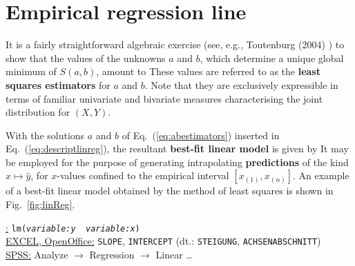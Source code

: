 \section[Empirical regression line]{Empirical regression line}
It is a fairly straightforward algebraic exercise (see, e.g., 
Toutenburg (2004) ) to show that the 
values of the unknowns $a$ and $b$, which determine a unique 
global minimum of $S(a,b)$, amount to
%
\be
{}
\ee
%
These values are referred to as the \textbf{least squares
estimators} for $a$ and $b$. Note that they are exclusively
expressible in terms of familiar univariate and bivariate measures characterising the joint distribution for $(X,Y)$.

\medskip
\noindent
With the solutions $a$ and $b$ of Eq.~(\ref{eq:abestimators})
inserted in Eq.~(\ref{eq:descriptlinreg}), the resultant
\textbf{best-fit linear model} is given by
%
%
\be
{}
\ee
%
It may be employed for the purpose of generating intrapolating 
\textbf{predictions} of the kind $x \mapsto \hat{y}$, for
$x$-values confined to the empirical interval $[x_{(1)},x_{(n)}]$.
An example of a best-fit linear model obtained by the method of
least squares is shown in Fig.~\ref{fig:linReg}.

\medskip
\noindent
\underline{\R:}
\texttt{lm(\textit{variable:y}~\texttildelow~\textit{variable:x})}
\\
\underline{EXCEL, OpenOffice:} \texttt{SLOPE}, \texttt{INTERCEPT}
(dt.: \texttt{STEIGUNG}, \texttt{ACHSENABSCHNITT}) \\
\underline{SPSS:} Analyze $\rightarrow$ Regression
$\rightarrow$ Linear \ldots

